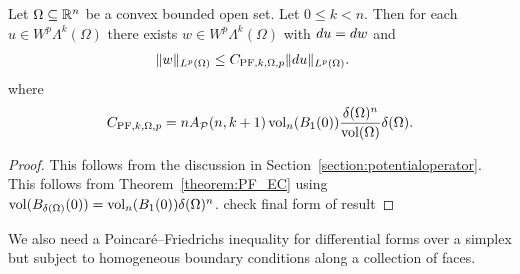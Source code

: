 \documentclass[10pt,a4paper]{article}
\newcommand{\mwl}[1]{{\color{red}#1}}
\begin{document}
\begin{lemma}\label{lemma:PFexteriorsimplex}
    Let $\Omega \subseteq {\mathbb R}^{n}$ be a convex bounded open set. 
    Let $0 \leq k < n$. 
    Then for each $u \in W^{p}\Lambda^{k}(\Omega)$ 
    there exists $w \in W^{p}\Lambda^{k}(\Omega)$ 
    with $d u = d w$ and 
    \begin{align*}
        \| w \|_{L^{p}(\Omega)}
        &
        \leq 
        C_{{{\rm PF}},k,\Omega,p}
        \| d u \|_{L^{p}(\Omega)}
        .
    \end{align*}
    where 
    \begin{align*}
        C_{{{\rm PF}},k,\Omega,p} 
        = 
        n A_{{\mathcal P}}(n,k+1) 
        \operatorname{vol}_{n}(B_1(0)) 
        \frac{ {\delta}(\Omega)^{n} }{ \operatorname{vol}(\Omega) } 
        {\delta}(\Omega)
        .
    \end{align*}
\end{lemma}
\begin{proof}
    This follows from the discussion in Section~\ref{section:potentialoperator}.
    This follows from Theorem~\ref{theorem:PF_EC} using $\operatorname{vol}(B_{{\delta}(\Omega)}(0)) = \operatorname{vol}_{n}(B_1(0)) {\delta}(\Omega)^{n}$.
	\mwl{check final form of result}
\end{proof}

We also need a Poincar\'e--Friedrichs inequality for differential forms over a simplex but subject to homogeneous boundary conditions along a collection of faces. 
\end{document}
